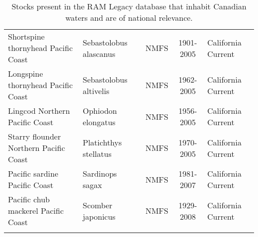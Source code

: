 \begin{longtable}{p{4cm}p{3.5cm}ccp{5.5cm}}
  Shortspine thornyhead Pacific Coast & Sebastolobus alascanus & NMFS & 1901-2005 & California Current \\ 
  Longspine thornyhead Pacific Coast & Sebastolobus altivelis & NMFS & 1962-2005 & California Current \\ 
  Lingcod Northern Pacific Coast & Ophiodon elongatus & NMFS & 1956-2005 & California Current \\ 
  Starry flounder Northern Pacific Coast & Platichthys stellatus & NMFS & 1970-2005 & California Current \\ 
  Pacific sardine Pacific Coast & Sardinops sagax & NMFS & 1981-2007 & California Current \\ 
  Pacific chub mackerel Pacific Coast & Scomber japonicus & NMFS & 1929-2008 & California Current \\ 
   \hline
\hline
\caption{Stocks present in the RAM Legacy database that inhabit Canadian waters and are of national relevance.}
\label{tab:crosshair}
\end{longtable}
